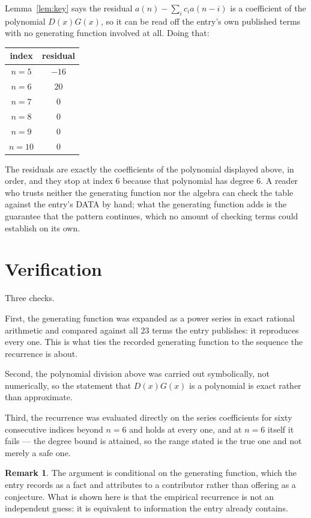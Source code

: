 \documentclass[11pt,a4paper]{article}
\theoremstyle{plain}
\theoremstyle{definition}
\newtheorem{remark}[theorem]{Remark}
\begin{document}
Lemma~\ref{lem:key} says the residual $a(n)-\sum_ic_ia(n-i)$ is a coefficient of the
polynomial $D(x)G(x)$, so it can be read off the entry's own published terms with no
generating function involved at all. Doing that:
\begin{center}
\begin{tabular}{cc}
index & residual \\ \hline
$n=5$ & $-16$ \\
$n=6$ & $20$ \\
$n=7$ & $0$ \\
$n=8$ & $0$ \\
$n=9$ & $0$ \\
$n=10$ & $0$
\end{tabular}
\end{center}
The residuals are exactly the coefficients of the polynomial displayed above, in order, and
they stop at index $6$ because that polynomial has degree $6$. A reader who trusts
neither the generating function nor the algebra can check the table against the entry's DATA
by hand; what the generating function adds is the guarantee that the pattern continues, which
no amount of checking terms could establish on its own.

\section{Verification}

Three checks.

First, the generating function was expanded as a power series in exact rational arithmetic and
compared against all $23$ terms the entry publishes: it reproduces every one. This is
what ties the recorded generating function to the sequence the recurrence is about.

Second, the polynomial division above was carried out symbolically, not numerically, so the
statement that $D(x)G(x)$ is a polynomial is exact rather than approximate.

Third, the recurrence was evaluated directly on the series coefficients for sixty consecutive
indices beyond $n=6$ and holds at every one, and at $n=6$ itself it fails --- the
degree bound is attained, so the range stated is the true one and not merely a safe one.

\begin{remark}
The argument is conditional on the generating function, which the entry records as a fact and
attributes to a contributor rather than offering as a conjecture. What is shown here is that
the empirical recurrence is not an independent guess: it is equivalent to information the
entry already contains.
\end{remark}
\end{document}
